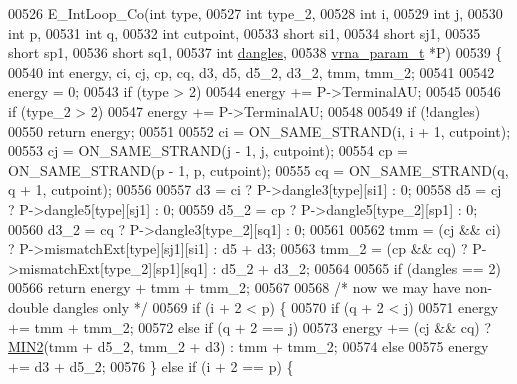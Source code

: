 \begin{DoxyCode}
00526 E\_IntLoop\_Co(\textcolor{keywordtype}{int}          type,
00527              \textcolor{keywordtype}{int}          type\_2,
00528              \textcolor{keywordtype}{int}          i,
00529              \textcolor{keywordtype}{int}          j,
00530              \textcolor{keywordtype}{int}          p,
00531              \textcolor{keywordtype}{int}          q,
00532              \textcolor{keywordtype}{int}          cutpoint,
00533              \textcolor{keywordtype}{short}        si1,
00534              \textcolor{keywordtype}{short}        sj1,
00535              \textcolor{keywordtype}{short}        sp1,
00536              \textcolor{keywordtype}{short}        sq1,
00537              \textcolor{keywordtype}{int}          \hyperlink{group__model__details_ga72b511ed1201f7e23ec437e468790d74}{dangles},
00538              \hyperlink{group__energy__parameters_structvrna__param__s}{vrna\_param\_t} *P)
00539 \{
00540   \textcolor{keywordtype}{int} energy, ci, cj, cp, cq, d3, d5, d5\_2, d3\_2, tmm, tmm\_2;
00541 
00542   energy = 0;
00543   \textcolor{keywordflow}{if} (type > 2)
00544     energy += P->TerminalAU;
00545 
00546   \textcolor{keywordflow}{if} (type\_2 > 2)
00547     energy += P->TerminalAU;
00548 
00549   \textcolor{keywordflow}{if} (!dangles)
00550     \textcolor{keywordflow}{return} energy;
00551 
00552   ci  = ON\_SAME\_STRAND(i, i + 1, cutpoint);
00553   cj  = ON\_SAME\_STRAND(j - 1, j, cutpoint);
00554   cp  = ON\_SAME\_STRAND(p - 1, p, cutpoint);
00555   cq  = ON\_SAME\_STRAND(q, q + 1, cutpoint);
00556 
00557   d3    = ci  ? P->dangle3[type][si1]   : 0;
00558   d5    = cj  ? P->dangle5[type][sj1]   : 0;
00559   d5\_2  = cp  ? P->dangle5[type\_2][sp1] : 0;
00560   d3\_2  = cq  ? P->dangle3[type\_2][sq1] : 0;
00561 
00562   tmm   = (cj && ci) ? P->mismatchExt[type][sj1][si1]   : d5 + d3;
00563   tmm\_2 = (cp && cq) ? P->mismatchExt[type\_2][sp1][sq1] : d5\_2 + d3\_2;
00564 
00565   \textcolor{keywordflow}{if} (dangles == 2)
00566     \textcolor{keywordflow}{return} energy + tmm + tmm\_2;
00567 
00568   \textcolor{comment}{/* now we may have non-double dangles only */}
00569   \textcolor{keywordflow}{if} (i + 2 < p) \{
00570     \textcolor{keywordflow}{if} (q + 2 < j)
00571       energy += tmm + tmm\_2;
00572     \textcolor{keywordflow}{else} \textcolor{keywordflow}{if} (q + 2 == j)
00573       energy += (cj && cq) ? \hyperlink{group__utils_gae0b9cd0ce090bd69b951aa73e8fa4f7d}{MIN2}(tmm + d5\_2, tmm\_2 + d3) : tmm + tmm\_2;
00574     \textcolor{keywordflow}{else}
00575       energy += d3 + d5\_2;
00576   \} \textcolor{keywordflow}{else} \textcolor{keywordflow}{if} (i + 2 == p) \{

\end{DoxyCode}
